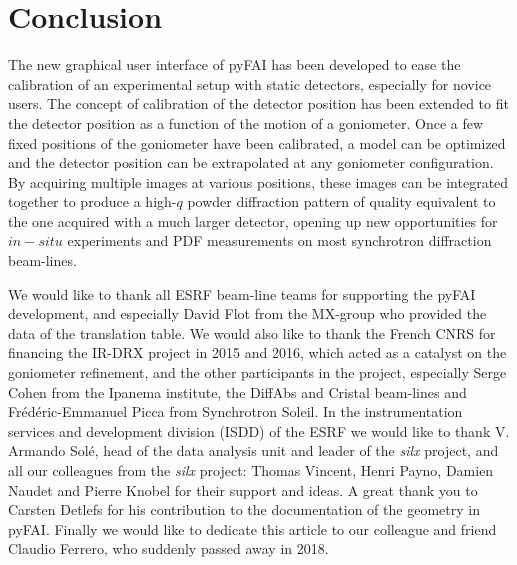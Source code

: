 \documentclass[preprint]{iucr}              %
\begin{document}
\section{Conclusion}

The new graphical user interface of pyFAI has been developed to ease the
calibration of an experimental setup with static detectors, especially for
novice users.
The concept of calibration of the detector position has been extended to fit
the detector position as a function of the motion of a goniometer.   
Once a few fixed positions of the goniometer have been calibrated, a model can
be optimized and the detector position can be extrapolated at any goniometer
configuration.
By acquiring multiple images at various positions, these images can be
integrated together to produce a high-$q$ powder diffraction pattern of
quality equivalent to the one acquired with a much larger detector, opening 
up new opportunities for $in-situ$ experiments and PDF measurements on most 
synchrotron diffraction beam-lines. 

 

We would like to thank all ESRF beam-line teams for supporting the
pyFAI development, and especially David Flot from the MX-group who provided the
data of the translation table. 
We would also like to thank the French CNRS for financing the IR-DRX project
in 2015 and 2016, which acted as a catalyst on the goniometer refinement,
and the other participants in the project, especially Serge Cohen from the
Ipanema institute, the DiffAbs and Cristal beam-lines and Frédéric-Emmanuel Picca 
from Synchrotron Soleil.
In the instrumentation services and development division (ISDD) of the ESRF  we
would like to thank V. Armando Solé, head of the data analysis unit and leader of 
the \textit{silx} project, and all our colleagues from the \textit{silx}
project:
Thomas Vincent, Henri Payno, Damien Naudet and  Pierre Knobel for their support and ideas. 
A great thank you to Carsten Detlefs for his contribution to the documentation of the geometry in pyFAI. 
Finally we would like to dedicate this article to our colleague and friend Claudio Ferrero, who suddenly passed away in 2018. 



\end{document}
